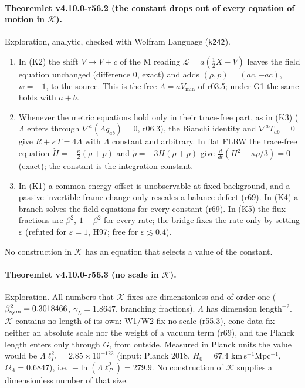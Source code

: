 \paragraph{Theoremlet v4.10.0-r56.2 (the constant drops out of every equation of motion in \(\mathcal K\)).}
Exploration, analytic, checked with Wolfram Language (\texttt{k242}).
\begin{enumerate}[leftmargin=2em]
\item[(a)] In (K2) the shift \(V\to V+c\) of the M reading \(\mathcal L=a(\tfrac12X-V)\) leaves the field equation unchanged (difference \(0\), exact) and adds
\((\rho,p)=(ac,-ac)\), \(w=-1\), to the source.  This is the free \(\Lambda=aV_{\min}\) of r03.5; under G1 the same holds with \(a+b\).
\item[(b)] Whenever the metric equations hold only in their trace-free part, as in (K3) (\(\Lambda\) enters through \(\nabla^a(\Lambda g_{ab})=0\), r06.3), the
Bianchi identity and \(\nabla^aT_{ab}=0\) give \(R+\kappa T=4\Lambda\) with \(\Lambda\) constant and arbitrary.  In flat FLRW the trace-free equation
\(\dot H=-\tfrac\kappa2(\rho+p)\) and \(\dot\rho=-3H(\rho+p)\) give \(\tfrac{d}{dt}(H^2-\kappa\rho/3)=0\) (exact); the constant is the integration constant.
\item[(c)] In (K1) a common energy offset is unobservable at fixed background, and a passive invertible frame change only rescales a balance defect
(r69).  In (K4) a branch solves the field equations for every constant (r69).  In (K5) the flux fractions are \(\beta^2\), \(1-\beta^2\) for every rate;
the bridge fixes the rate only by setting \(\varepsilon\) (refuted for \(\varepsilon=1\), H97; free for \(\varepsilon\lesssim0.4\)).
\end{enumerate}
No construction in \(\mathcal K\) has an equation that selects a value of the constant.

\paragraph{Theoremlet v4.10.0-r56.3 (no scale in \(\mathcal K\)).}
Exploration.  All numbers that \(\mathcal K\) fixes are dimensionless and of order one (\(\beta_{\rm sym}^2=0.3018466\), \(\gamma_L=1.8647\), branching
fractions).  \(\Lambda\) has dimension length\({}^{-2}\).  \(\mathcal K\) contains no length of its own: W1/W2 fix no scale (r55.3), cone data fix neither an absolute
scale nor the weight of a vacuum term (r69), and the Planck length enters only through \(G\), from outside.  Measured in Planck units the value
would be \(\Lambda\ell_P^2=2.85\times10^{-122}\) (input: Planck 2018, \(H_0=67.4\) km\,s\(^{-1}\)Mpc\(^{-1}\), \(\Omega_\Lambda=0.6847\)), i.e.\ \(-\ln(\Lambda\ell_P^2)=279.9\).
No construction of \(\mathcal K\) supplies a dimensionless number of that size.

